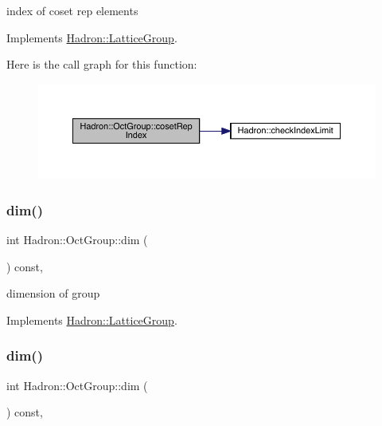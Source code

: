 index of coset rep elements 

Implements \mbox{\hyperlink{structHadron_1_1LatticeGroup_a7e3b9b5e2f596e6c40d64aa939a3ad6c}{Hadron\+::\+Lattice\+Group}}.

Here is the call graph for this function\+:
\nopagebreak
\begin{figure}[H]
\begin{center}
\leavevmode
\includegraphics[width=350pt]{d1/de5/structHadron_1_1OctGroup_aeaabc93ad3df1b585bc1009b0bf4f5ba_cgraph}
\end{center}
\end{figure}
\mbox{\label{structHadron_1_1OctGroup_a1db49add38b9263bfd536b3da0cc1566}} 
\subsubsection{\texorpdfstring{dim()}{dim()}\hspace{0.1cm}{\footnotesize\ttfamily [1/2]}}
{\footnotesize\ttfamily int Hadron\+::\+Oct\+Group\+::dim (\begin{DoxyParamCaption}{ }\end{DoxyParamCaption}) const\hspace{0.3cm}{\ttfamily [inline]}, {\ttfamily [virtual]}}

dimension of group 

Implements \mbox{\hyperlink{structHadron_1_1LatticeGroup_abd8415698323796ef6a8605796ee3bea}{Hadron\+::\+Lattice\+Group}}.

\mbox{\label{structHadron_1_1OctGroup_a1db49add38b9263bfd536b3da0cc1566}} 
\subsubsection{\texorpdfstring{dim()}{dim()}\hspace{0.1cm}{\footnotesize\ttfamily [2/2]}}
{\footnotesize\ttfamily int Hadron\+::\+Oct\+Group\+::dim (\begin{DoxyParamCaption}{ }\end{DoxyParamCaption}) const\hspace{0.3cm}{\ttfamily [inline]}, {\ttfamily [virtual]}}

